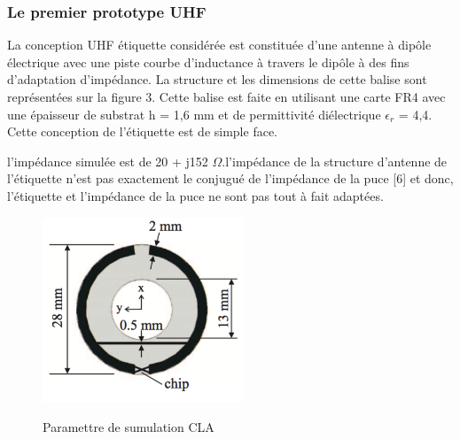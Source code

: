 \documentclass[11pt, a4paper, twoside]{book}
\begin{document}
\subsubsection{Le premier prototype UHF}


La conception UHF étiquette considérée est constituée d’une antenne à dipôle électrique avec une piste courbe d’inductance à travers le dipôle à des fins d'adaptation d'impédance. La structure et les dimensions de cette balise sont représentées sur la figure 3. Cette balise est faite en utilisant une carte FR4 avec une épaisseur de substrat h = 1,6 mm et de permittivité diélectrique \(\epsilon_{r}\) = 4,4. Cette conception de l’étiquette est de simple face.

 l'impédance simulée est de 20 + j152 \(\Omega\).l'impédance de la structure d'antenne de l'étiquette n'est pas exactement le conjugué de l'impédance de la puce [6] et donc, l'étiquette et l'impédance de la puce ne sont pas tout à fait adaptées.\\
 
 \begin{figure}[H]
\centering
\includegraphics[width=6cm]{dofi}\\
\caption{Paramettre de sumulation CLA}
\end{figure} 
\end{document}

